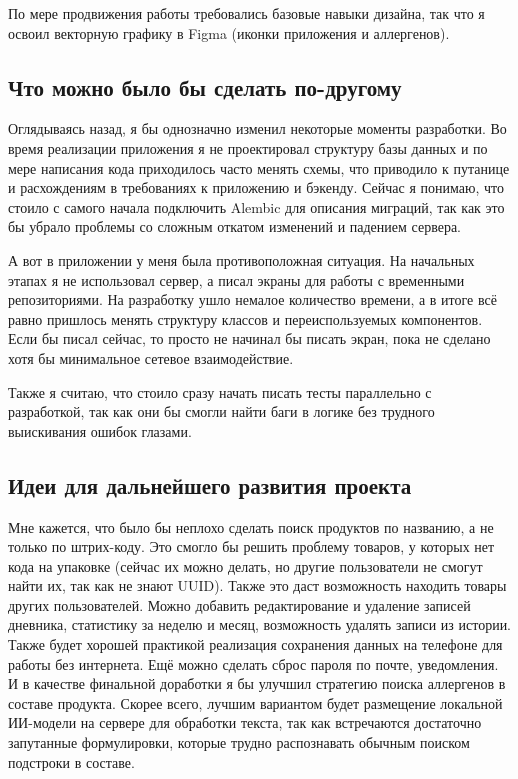 \documentclass[14pt,a4paper]{extarticle}
\begin{document}
По мере продвижения работы требовались базовые навыки дизайна, так что я освоил векторную графику в Figma (иконки приложения и аллергенов).

\subsection{Что можно было бы сделать по-другому}
Оглядываясь назад, я бы однозначно изменил некоторые моменты разработки. Во время реализации приложения я не проектировал структуру базы данных и по мере написания кода приходилось часто менять схемы, что приводило к путанице и расхождениям в требованиях к приложению и бэкенду. Сейчас я понимаю, что стоило с самого начала подключить Alembic для описания миграций, так как это бы убрало проблемы со сложным откатом изменений и падением сервера.

А вот в приложении у меня была противоположная ситуация. На начальных этапах я не использовал сервер, а писал экраны для работы с временными репозиториями. На разработку ушло немалое количество времени, а в итоге всё равно пришлось менять структуру классов и переиспользуемых компонентов. Если бы писал сейчас, то просто не начинал бы писать экран, пока не сделано хотя бы минимальное сетевое взаимодействие.

Также я считаю, что стоило сразу начать писать тесты параллельно с разработкой, так как они бы смогли найти баги в логике без трудного выискивания ошибок глазами.

\subsection{Идеи для дальнейшего развития проекта}

Мне кажется, что было бы неплохо сделать поиск продуктов по названию, а не только по штрих-коду. Это смогло бы решить проблему товаров, у которых нет кода на упаковке (сейчас их можно делать, но другие пользователи не смогут найти их, так как не знают UUID). Также это даст возможность находить товары других пользователей. Можно добавить редактирование и удаление записей дневника, статистику за неделю и месяц, возможность удалять записи из истории. Также будет хорошей практикой реализация сохранения данных на телефоне для работы без интернета. Ещё можно сделать сброс пароля по почте, уведомления.
И в качестве финальной доработки я бы улучшил стратегию поиска аллергенов в составе продукта. Скорее всего, лучшим вариантом будет размещение локальной ИИ-модели на сервере для обработки текста, так как встречаются достаточно запутанные формулировки, которые трудно распознавать обычным поиском подстроки в составе.
\end{document}
